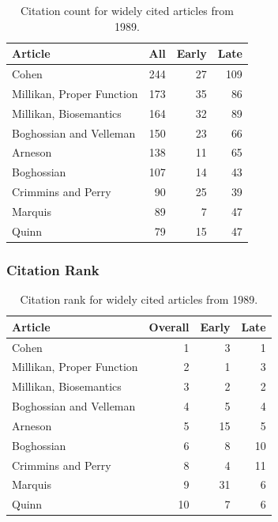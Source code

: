 \documentclass[
  10pt,
  letterpaper,
  DIV=11,
  numbers=noendperiod,
  twoside]{scrartcl}
\begin{document}
\begin{longtable}[]{@{}lrrr@{}}

\caption{\label{tbl-citation-count-1989}Citation count for widely cited
articles from 1989.}

\tabularnewline

\toprule\noalign{}
Article & All & Early & Late \\
\midrule\noalign{}
\endhead
\bottomrule\noalign{}
\endlastfoot
Cohen & 244 & 27 & 109 \\
Millikan, Proper Function & 173 & 35 & 86 \\
Millikan, Biosemantics & 164 & 32 & 89 \\
Boghossian and Velleman & 150 & 23 & 66 \\
Arneson & 138 & 11 & 65 \\
Boghossian & 107 & 14 & 43 \\
Crimmins and Perry & 90 & 25 & 39 \\
Marquis & 89 & 7 & 47 \\
Quinn & 79 & 15 & 47 \\

\end{longtable}

\subsubsection*{Citation Rank}\label{citation-rank-13}

\begin{longtable}[]{@{}lrrr@{}}

\caption{\label{tbl-citation-rank-1989}Citation rank for widely cited
articles from 1989.}

\tabularnewline

\toprule\noalign{}
Article & Overall & Early & Late \\
\midrule\noalign{}
\endhead
\bottomrule\noalign{}
\endlastfoot
Cohen & 1 & 3 & 1 \\
Millikan, Proper Function & 2 & 1 & 3 \\
Millikan, Biosemantics & 3 & 2 & 2 \\
Boghossian and Velleman & 4 & 5 & 4 \\
Arneson & 5 & 15 & 5 \\
Boghossian & 6 & 8 & 10 \\
Crimmins and Perry & 8 & 4 & 11 \\
Marquis & 9 & 31 & 6 \\
Quinn & 10 & 7 & 6 \\

\end{longtable}
\end{document}
